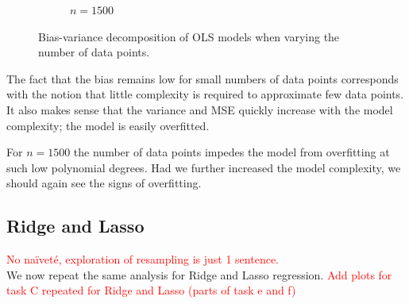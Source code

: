 \documentclass[twocolumn,english,notitlepage]{article}
\newcommand{\comment}[1]{\textcolor{red}{#1}}
\begin{document}
\begin{figure}[ht]
\begin{subfigure}{.5\textwidth}
                    \caption{$n=1500$}
                \end{subfigure}
                
                \caption{Bias-variance decomposition of OLS models when varying the number of data points.}
                \label{res:fig:bs_bias_var_data_points}
            \end{figure}
            The fact that the bias remains low for small numbers of data points corresponds with the notion that little complexity is required to approximate few data points. It also makes sense that the variance and MSE quickly increase with the model complexity; the model is easily overfitted. 

            For $n=1500$ the number of data points impedes the model from overfitting at such low polynomial degrees. Had we further increased the model complexity, we should again see the signs of overfitting. 

    

    \subsection{Ridge and Lasso}
        \comment{No naïveté, exploration of resampling is just 1 sentence.}\\
        We now repeat the same analysis for Ridge and Lasso regression. \comment{Add plots for task C repeated for Ridge and Lasso (parts of task e and f)}
        
\end{document}
